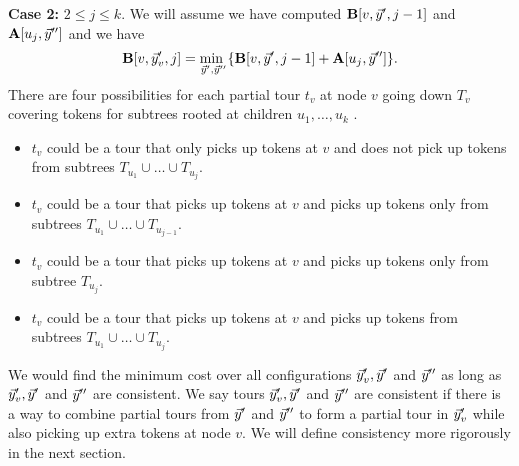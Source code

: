 \documentclass[twoside,leqno]{article}
\newcommand{\mi}[1]{\underset{#1}{\text{min }}}
\begin{document}
\textbf{Case 2:} $2 \le j \le k$. We will assume we have computed $\textbf{B}[v, \vec{y}', j - 1]$ and $\textbf{A}[u_{j}, \vec{y}'']$ and we have
$$\bbold[v, \yvec_v', j] = \mi{\yvec', \yvec''} \{\bbold[v, \yvec', j - 1] + \abold[u_{j}, \yvec''] \}.$$
There are four possibilities for each partial tour $t_v$ at node $v$ going down $T_v$ covering tokens for subtrees rooted at children $u_1, \ldots, u_k$ .
\begin{itemize}
    \item $t_v$ could be a tour that only picks up tokens at $v$ and does not pick up tokens from subtrees $T_{u_1} \cup \ldots \cup T_{u_{j}}$.
    \item $t_v$ could be a tour that picks up tokens at $v$ and picks up tokens only from subtrees $T_{u_1} \cup \ldots \cup T_{u_{j-1}}$.
    \item $t_v$ could be a tour that picks up tokens at $v$ and picks up tokens only from subtree $T_{u_{j}}$.
    \item $t_v$ could be a tour that picks up tokens at $v$ and picks up tokens from subtrees $T_{u_1} \cup \ldots \cup T_{u_{j}}$.
\end{itemize}
We would find the minimum cost over all configurations $\vec{y}_v', \vec{y}'$ and $\vec{y}''$ as long as $\vec{y}_v', \vec{y}'$ and $\vec{y}''$ are consistent. We say tours $\vec{y}_v',\vec{y}'$ and $\vec{y}''$ are consistent if there is a way to combine partial tours from $\vec{y}'$ and $\vec{y}''$ to form a partial tour in $\vec{y}_v'$ while also picking up extra tokens at node $v$. We will define consistency more rigorously in the next section.

\end{document}
